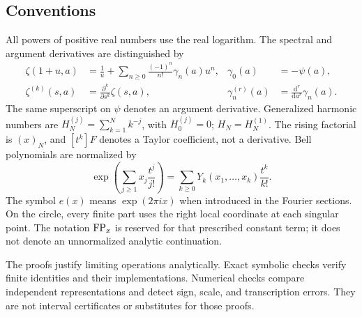 \subsection{Conventions}
All powers of positive real numbers use the real logarithm. The spectral
and argument derivatives are distinguished by
\begin{align}
 \zeta(1+u,a)&=\frac1u+\sum_{n\ge0}\frac{(-1)^n}{n!}\gamma_n(a)u^n,
 &\gamma_0(a)&=-\psi(a), \label{eq:laurent}\\
 \zeta^{(k)}(s,a)&=\frac{\partial^k}{\partial s^k}\zeta(s,a),
 &\gamma_n^{(r)}(a)&=\frac{\mathrm d^r}{\mathrm da^r}\gamma_n(a).
\end{align}
The same superscript on $\psi$ denotes an argument derivative. Generalized
harmonic numbers are $H_N^{(j)}=\sum_{k=1}^Nk^{-j}$, with $H_0^{(j)}=0$;
$H_N=H_N^{(1)}$. The rising factorial is $(x)_N$, and $[t^k]F$ denotes a
Taylor coefficient, not a derivative. Bell polynomials are normalized by
\[
 \exp\!\left(\sum_{j\ge1}x_j\frac{t^j}{j!}\right)
 =\sum_{k\ge0}Y_k(x_1,\ldots,x_k)\frac{t^k}{k!}.
\]
The symbol $e(x)$ means $\exp(2\pi i x)$ when introduced in the Fourier
sections. On the circle, every finite part uses the right local
coordinate at each singular point. The notation $\operatorname{FP}_x$ is reserved for
that prescribed constant term; it does not denote an unnormalized
analytic continuation.

The proofs justify limiting operations analytically. Exact symbolic
checks verify finite identities and their implementations. Numerical
checks compare independent representations and detect sign, scale, and
transcription errors. They are not interval certificates or substitutes
for those proofs.
